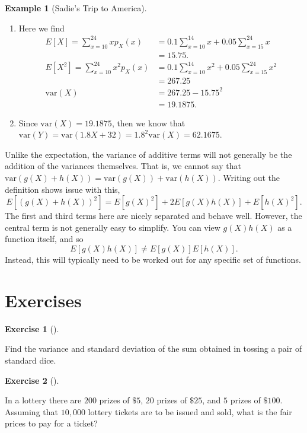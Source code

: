 \documentclass[
  letterpaper,
  DIV=11,
  numbers=noendperiod]{scrreprt}
\theoremstyle{definition}
\newtheorem{exercise}{Exercise}[chapter]
\theoremstyle{definition}
\newtheorem{example}{Example}[chapter]
\theoremstyle{definition}
\theoremstyle{remark}
\begin{document}
\begin{example}[Sadie's Trip to
America]
\begin{tcolorbox}[enhanced jigsaw, colback=white, colframe=quarto-callout-color-frame, arc=.35mm, leftrule=.75mm, rightrule=.15mm, opacityback=0, breakable, bottomrule=.15mm, left=2mm, toprule=.15mm]
\begin{enumerate}
\def\labelenumi{\alph{enumi}.}
\item
  Here we find \begin{align*}
   E[X] = \sum_{x=10}^{24} xp_X(x) &= 0.1\sum_{x=10}^{14}x + 0.05\sum_{x=15}^{24}x \\
   &= 15.75. \\
   E[X^2] = \sum_{x=10}^{24} x^2p_X(x) &= 0.1\sum_{x=10}^{14}x^2 + 0.05\sum_{x=15}^{24}x^2 \\
   &= 267.25 \\
   \text{var}(X) &= 267.25 - 15.75^2 \\
   &= 19.1875.
  \end{align*}
\item
  Since \(\text{var}(X) = 19.1875\), then we know that
  \(\text{var}(Y) = \text{var}(1.8X + 32) = 1.8^2\text{var}(X) = 62.1675\).
\end{enumerate}

\end{tcolorbox}

\end{example}

Unlike the expectation, the variance of additive terms will not
generally be the addition of the variances themselves. That is, we
cannot say that
\(\text{var}(g(X) + h(X)) = \text{var}(g(X)) + \text{var}(h(X))\).
Writing out the definition shows issue with this,
\[E[(g(X) + h(X))^2] = E[g(X)^2] + 2E[g(X)h(X)] + E[h(X)^2].\] The first
and third terms here are nicely separated and behave well. However, the
central term is not generally easy to simplify. You can view
\(g(X)h(X)\) as a function itself, and so
\[E[g(X)h(X)] \neq E[g(X)]E[h(X)].\] Instead, this will typically need
to be worked out for any specific set of functions.

\section*{Exercises}\label{exercises-4}


\begin{exercise}[]\protect\hypertarget{exr-6.1}{}\label{exr-6.1}

Find the variance and standard deviation of the sum obtained in tossing
a pair of standard dice.

\end{exercise}

\begin{exercise}[]\protect\hypertarget{exr-6.2}{}\label{exr-6.2}

In a lottery there are \(200\) prizes of \(\$5\), \(20\) prizes of
\(\$25\), and \(5\) prizes of \(\$100\). Assuming that \(10,000\)
lottery tickets are to be issued and sold, what is the fair prices to
pay for a ticket?

\end{exercise}
\end{document}
